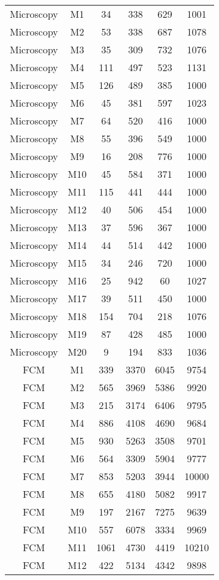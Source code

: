 \begin{center}
\begin{longtable}{cccccc}
\hline \hline
\endlastfoot	
Microscopy	&	M1	&	34	&	338	&	629	&	1001	\\
Microscopy	&	M2	&	53	&	338	&	687	&	1078	\\
Microscopy	&	M3	&	35	&	309	&	732	&	1076	\\
Microscopy	&	M4	&	111	&	497	&	523	&	1131	\\
Microscopy	&	M5	&	126	&	489	&	385	&	1000	\\
Microscopy	&	M6	&	45	&	381	&	597	&	1023	\\
Microscopy	&	M7	&	64	&	520	&	416	&	1000	\\
Microscopy	&	M8	&	55	&	396	&	549	&	1000	\\
Microscopy	&	M9	&	16	&	208	&	776	&	1000	\\
Microscopy	&	M10	&	45	&	584	&	371	&	1000	\\
Microscopy	&	M11	&	115	&	441	&	444	&	1000	\\
Microscopy	&	M12	&	40	&	506	&	454	&	1000	\\
Microscopy	&	M13	&	37	&	596	&	367	&	1000	\\
Microscopy	&	M14	&	44	&	514	&	442	&	1000	\\
Microscopy	&	M15	&	34	&	246	&	720	&	1000	\\
Microscopy	&	M16	&	25	&	942	&	60	&	1027	\\
Microscopy	&	M17	&	39	&	511	&	450	&	1000	\\
Microscopy	&	M18	&	154	&	704	&	218	&	1076	\\
Microscopy	&	M19	&	87	&	428	&	485	&	1000	\\
Microscopy	&	M20	&	9	&	194	&	833	&	1036	\\
FCM	&	M1	&	339	&	3370	&	6045	&	9754	\\
FCM	&	M2	&	565	&	3969	&	5386	&	9920	\\
FCM	&	M3	&	215	&	3174	&	6406	&	9795	\\
FCM	&	M4	&	886	&	4108	&	4690	&	9684	\\
FCM	&	M5	&	930	&	5263	&	3508	&	9701	\\
FCM	&	M6	&	564	&	3309	&	5904	&	9777	\\
FCM	&	M7	&	853	&	5203	&	3944	&	10000	\\
FCM	&	M8	&	655	&	4180	&	5082	&	9917	\\
FCM	&	M9	&	197	&	2167	&	7275	&	9639	\\
FCM	&	M10	&	557	&	6078	&	3334	&	9969	\\
FCM	&	M11	&	1061	&	4730	&	4419	&	10210	\\
FCM	&	M12	&	422	&	5134	&	4342	&	9898	\\

\end{longtable}
\end{center}
